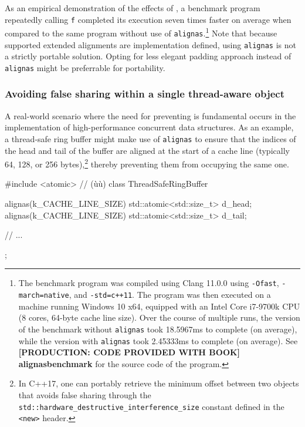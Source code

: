 \noindent As an empirical demonstration of the effects of ,
a benchmark program repeatedly calling \lstinline!f! completed its
execution seven times faster on average when compared to the same
program without use of \lstinline!alignas!.{\cprotect\footnote{The benchmark
program was compiled using Clang 11.0.0 using \lstinline!-Ofast!,
\lstinline!-march=native!, and \mbox{\lstinline!-std=c++11!}. The program was then
executed on a machine running Windows 10 x64, equipped with an Intel
Core i7-9700k CPU (8 cores, 64-byte cache line size). Over the
course of multiple runs, the version of the benchmark without
\lstinline!alignas! took 18.5967ms to complete (on average), while the
version with \lstinline!alignas! took 2.45333ms to complete (on average).
  See \textbf{{[PRODUCTION: CODE PROVIDED WITH BOOK] alignasbenchmark}} for the source code of the program.}} Note that because supported extended alignments are implementation defined, using \lstinline!alignas! is not a strictly portable solution. Opting for less elegant padding approach instead of \lstinline!alignas! might be preferrable for portability.

\subsubsection[Avoiding false sharing within a single thread-aware object]{Avoiding false sharing within a single thread-aware object}\label{avoiding-false-sharing-within-a-single-thread-aware-object}

A real-world scenario where the need for preventing  is fundamental occurs in the implementation of high-performance
concurrent data structures. As an example, a thread-safe ring buffer
might make use of \lstinline!alignas! to ensure that the indices of the
head and tail of the buffer are aligned at the start of a cache line
(typically 64, 128, or 256 bytes),\footnote{In C++17, one can portably retrieve the minimum offset between two objects that avoids false sharing through the \lstinline!std::hardware_destructive_interference_size! constant defined in the \lstinline!<new>! header.}  thereby preventing them from
occupying the same one.

\begin{emcppslisting}[emcppsbatch=e2]
#include <atomic>  // (ù{}ù)
class ThreadSafeRingBuffer
{
    alignas(k_CACHE_LINE_SIZE) std::atomic<std::size_t> d_head;
    alignas(k_CACHE_LINE_SIZE) std::atomic<std::size_t> d_tail;

    // ...
};
\end{emcppslisting}

